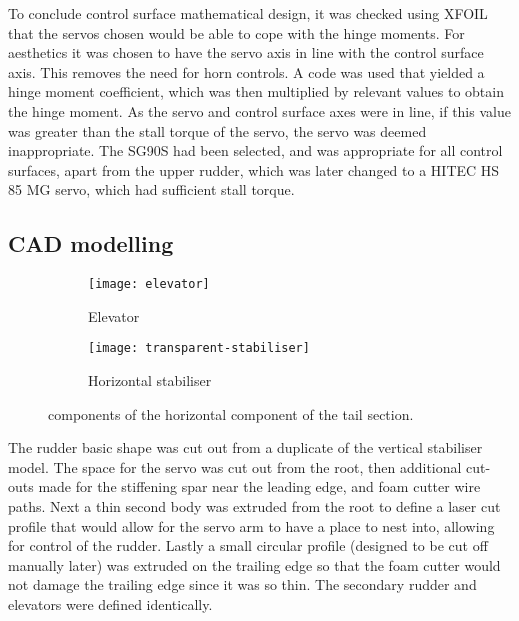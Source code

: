 \documentclass[../../main.tex]{subfiles}
\begin{document}
To conclude control surface mathematical design, it was checked using XFOIL that the servos chosen would be able to cope with the hinge moments.
For aesthetics it was chosen to have the servo axis in line with the control surface axis.
This removes the need for horn controls.
A code was used that yielded a hinge moment coefficient, which was then multiplied by relevant values to obtain the hinge moment.
As the servo and control surface axes were in line, if this value was greater than the stall torque of the servo, the servo was deemed inappropriate.
The SG90S had been selected, and was appropriate for all control surfaces, apart from the upper rudder, which was later changed to a HITEC HS 85 MG servo, which had sufficient stall torque. 

\subsection{CAD modelling} \label{sec:final-design-proposal:control-surfaces:cad-modelling}


\begin{figure}[H]

    \centering
    \begin{subfigure}[b]{0.49\columnwidth}
        \centering
        \texttt{[image: elevator]}
        \caption{Elevator}
        \label{fig:tail-assembly:elevator}
    \end{subfigure}
    \hfill
    \begin{subfigure}[b]{0.49\columnwidth}
        \centering
        \texttt{[image: transparent-stabiliser]}
        \caption{Horizontal stabiliser}
        \label{fig:tail-assembly:horizontal-stabiliser}
    \end{subfigure}
    
    \caption{components of the horizontal component of the tail section.}
    \label{fig:tail-assembly}
\end{figure} 

The rudder basic shape was cut out from a duplicate of the vertical stabiliser model.
The space for the servo was cut out from the root, then additional cut-outs made for the stiffening spar near the leading edge, and foam cutter wire paths.
Next a thin second body was extruded from the root to define a laser cut profile that would allow for the servo arm to have a place to nest into, allowing for control of the rudder.
Lastly a small circular profile (designed to be cut off manually later) was extruded on the trailing edge so that the foam cutter would not damage the trailing edge since it was so thin.
The secondary rudder and elevators were defined identically. 
\end{document}
